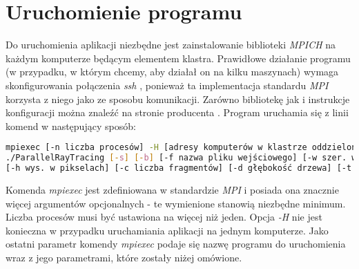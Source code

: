 \section{Uruchomienie programu}

Do uruchomienia aplikacji niezbędne jest zainstalowanie biblioteki \emph{MPICH} na każdym komputerze będącym elementem klastra. Prawidłowe działanie programu (w przypadku, w którym chcemy, aby działał on na kilku maszynach) wymaga skonfigurowania połączenia \emph{ssh} , ponieważ ta implementacja standardu \emph{MPI} korzysta z niego jako ze sposobu komunikacji. Zarówno bibliotekę jak i instrukcje konfiguracji można znaleźć na stronie producenta \cite{mpich}. Program uruchamia się z linii komend w następujący sposób:
\begin{center}
\begin{lstlisting}[language=bash, deletekeywords={test}, keepspaces=true, columns=flexible]
mpiexec [-n liczba procesów] -H [adresy komputerów w klastrze oddzielone przecinkami]
./ParallelRayTracing [-s] [-b] [-f nazwa pliku wejściowego] [-w szer. w pikselach]
[-h wys. w pikselach] [-c liczba fragmentów] [-d głębokość drzewa] [-t liczba testów]
\end{lstlisting}
\end{center}
Komenda \emph{mpiexec} jest zdefiniowana w standardzie \emph{MPI} i posiada ona znacznie więcej argumentów opcjonalnych - te wymienione stanowią niezbędne minimum. Liczba procesów musi być ustawiona na więcej niż jeden. Opcja \emph{-H} nie jest konieczna w przypadku uruchamiania aplikacji na jednym komputerze. Jako ostatni parametr komendy \emph{mpiexec} podaje się nazwę programu do uruchomienia wraz z jego parametrami, które zostały niżej omówione.

